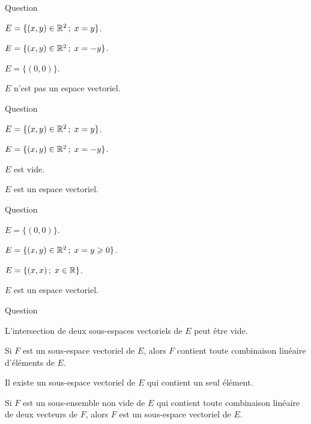 \begin{multi}[multiple,feedback=
{\(E\) est vide, donc \(E\) n'est pas un espace vectoriel.
}]{Question}
    \item \(E=\{(x,y) \in \mathbb{R}^2 \,  ; \;  x=y \}\).
    \item \(E=\{(x,y) \in \mathbb{R}^2 \,  ; \;  x=-y \}\).
    \item \(E=\{(0,0)\}\).
    \item* \(E\) n'est pas un espace vectoriel.
\end{multi}


\begin{multi}[multiple,feedback=
{\(E=\{(x,y) \in \Rr^2 \, ; \;  x+y=0\}\) est un sous-espace vectoriel de \(\Rr^2\).
}]{Question}
    \item \(E=\{(x,y) \in \mathbb{R}^2 \,  ; \;  x=y \}\).
    \item* \(E=\{(x,y) \in \mathbb{R}^2 \,  ; \;  x=-y \}\).
    \item \(E\) est vide.
    \item* \(E\) est un espace vectoriel.
\end{multi}


\begin{multi}[multiple,feedback=
{\(E=\{(x,y) \in \Rr^2 \, ; \;  x=y \} =\{(x,x) \;   ; \;  x \in \Rr \} \) est 
un sous-espace vectoriel de \(\Rr^2\).
}]{Question}
    \item \(E=\{(0,0)\}\).
    \item \(E=\{(x,y) \in \mathbb{R}^2 \, ; \;  x=y \geqslant 0\}\).
    \item* \(E=\{(x,x) \,   ; \;  x \in \mathbb{R} \}\).
    \item* \(E\) est un espace vectoriel.
\end{multi}


\begin{multi}[multiple,feedback=
{L'intersection de deux sous-espaces vectoriels de \(E\) contient au moins le vecteur nul. 
Le seul sous-espace vectoriel de \(E\) qui contient un seul élément est \(\{0_E\}\), où \(0_E\) est le zéro de \(E\).\\
Un sous-ensemble non vide de \(E\) est un sous-espace vectoriel de \(E\) si et seulement
s'il contient toute combinaison linéaire d'éléments de \(F\). Ceci revient à dire que \(F\) contient 
toute combinaison linéaire de deux éléments de \(F\).
}]{Question}
    \item L'intersection de deux sous-espaces vectoriels de \(E\) peut être vide.
    \item Si \(F\) est un sous-espace vectoriel de \(E\), alors \(F\) contient toute combinaison linéaire d'éléments de \(E\).
    \item* Il existe un sous-espace vectoriel de \(E\) qui contient un seul élément.
    \item* Si \(F\) est un sous-ensemble non vide de \(E\) qui contient  toute combinaison linéaire de deux vecteurs de \(F\), alors \(F\) est un sous-espace vectoriel de \(E\).
\end{multi}


